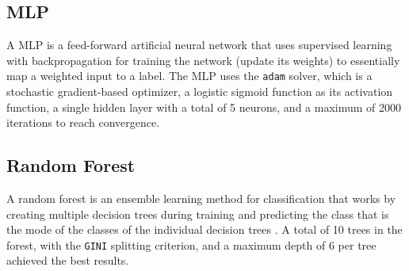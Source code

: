 \subsection{MLP}

A MLP is a feed-forward artificial neural network that uses supervised learning with backpropagation for training the network (update its weights) to essentially map a weighted input to a label. The MLP uses the \texttt{adam} solver, which is a stochastic gradient-based optimizer, a logistic sigmoid function as its activation function, a single hidden layer with a total of 5 neurons, and a maximum of 2000 iterations to reach convergence.

\subsection{Random Forest}

A random forest is an ensemble learning method for classification that works by creating multiple decision trees during training and predicting the class that is the mode of the classes of the individual decision trees \cite{data-mining-intro}. A total of 10 trees in the forest, with the \texttt{GINI} splitting criterion, and a maximum depth of 6 per tree achieved the best results.
